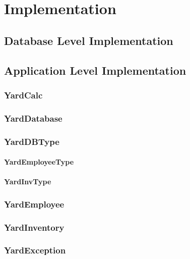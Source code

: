 \documentclass{report}
\begin{document}
\chapter{Implementation}

	\section{Database Level Implementation}

	\section{Application Level Implementation}

	\subsection{YardCalc}

	\subsection{YardDatabase}

	\subsection{YardDBType}

	\subsubsection{YardEmployeeType}

	\subsubsection{YardInvType}


	\subsection{YardEmployee}

	\subsection{YardInventory}

	\subsection{YardException}
\end{document}
